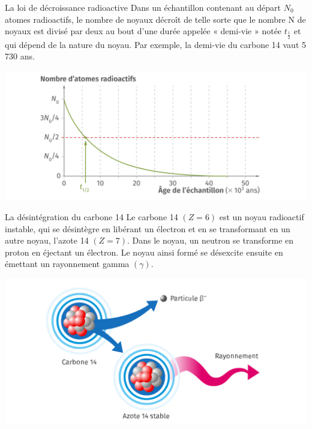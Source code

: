 \documentclass[24pt]{article}
\begin{document}
\begin{minipage}[c]{0.45\textwidth}
    \begin{documentpeda}{La loi de décroissance radioactive}
        Dans un échantillon contenant au départ $N_0$ atomes radioactifs,
        le nombre de noyaux décroît de telle sorte que le nombre N
        de noyaux est divisé par deux au bout d’une durée appelée « demi-vie » notée $t_{\frac{1}{2}}$
        et qui dépend de la nature du noyau. Par exemple, la demi-vie du carbone 14 vaut 5 730 ans.
        \begin{center}
            \includegraphics[width=\columnwidth]{doc2.png}
        \end{center}
    \end{documentpeda}
\end{minipage}
\hspace{0.1\textwidth}
\begin{minipage}[c]{0.45\textwidth}
    \begin{documentpeda}{La désintégration du carbone 14}
        Le carbone 14 $(Z=6)$ est un noyau radioactif instable, qui se désintègre en libérant un électron et
        en se transformant en un autre noyau,
        l’azote 14 $(Z=7)$. Dans le noyau, un neutron se transforme en proton en éjectant un électron.
        Le noyau ainsi formé se désexcite ensuite en émettant un rayonnement gamma $(γ)$.

        \begin{center}
            \includegraphics[width=\columnwidth]{doc3.png}
        \end{center}
    \end{documentpeda}
\end{minipage}
\end{document}
